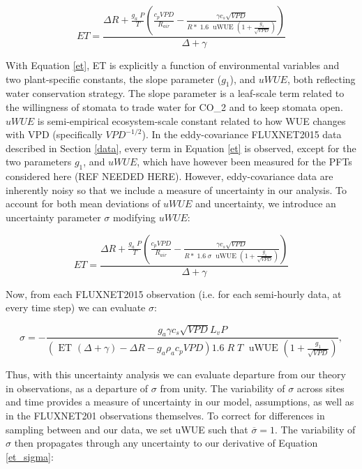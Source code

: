 \documentclass[draft,linenumbers]{agujournal}
\begin{document}
\begin{linenomath*}
  \begin{equation}
    ET = \frac{\Delta R + \frac{g_a\; P}{T} \left( \frac{ c_p VPD}{R_{air}} -  \frac{\gamma c_s \sqrt{VPD} }{ R* \; 1.6\; \text{ uWUE } (1 + \frac{g_1}{\sqrt{VPD}})} \right) }{ \Delta + \gamma}
    \label{et}
  \end{equation}
\end{linenomath*}

With Equation \ref{et}, ET is explicitly a function of environmental variables and two plant-specific constants, the slope parameter ($g_1$), and $uWUE$, both reflecting water conservation strategy. The slope parameter is a leaf-scale term related to the willingness of stomata to trade water for CO_2 and to keep stomata open. $uWUE$ is semi-empirical ecosystem-scale constant related to how WUE changes with VPD (specifically $VPD^{-1/2}$). In the eddy-covariance FLUXNET2015 data described in Section \ref{data}, every term in Equation \ref{et} is observed, except for the two parameters $g_1$, and $uWUE$, which have however been measured for the PFTs considered here (REF NEEDED HERE). However, eddy-covariance data are inherently noisy so that we include a measure of uncertainty in our analysis. To account for both mean deviations of $uWUE$ and uncertainty, we introduce an uncertainty parameter $\sigma$ modifying $uWUE$:

\begin{linenomath*}
  \begin{equation}
    ET = \frac{\Delta R + \frac{g_a\; P}{T} \left( \frac{ c_p VPD}{R_{air}} -  \frac{\gamma c_s \sqrt{VPD} }{ R* \; 1.6\; \sigma \; \text{ uWUE } (1 + \frac{g_1}{\sqrt{VPD}})} \right) }{ \Delta + \gamma}
    \label{et_sigma}
  \end{equation}
\end{linenomath*}

Now, from each FLUXNET2015 observation (i.e. for each semi-hourly data, at every time step) we can evaluate $\sigma$:

\begin{linenomath*}
  \begin{equation}
\sigma = - \frac{g_a \gamma c_s \sqrt{VPD} L_v P }{ \left(\text{ ET } ( \Delta + \gamma) - \Delta R - g_a \rho_a c_p VPD\right) 1.6 \; R\; T\; \text{ uWUE } (1 + \frac{g_1}{\sqrt{VPD}})},
    \label{sigma}
  \end{equation}
\end{linenomath*}

Thus, with this uncertainty analysis we can evaluate departure from our theory in observations, as a departure of $\sigma$ from unity. The variability of $\sigma$ across sites and time provides a measure of uncertainty in our model, assumptions, as well as in the FLUXNET201 observations themselves. To correct for differences in sampling between \cite{Zhou_2015} and our data, we set uWUE such that $\overline{\sigma} = 1$. The variability of $\sigma$ then propagates through any uncertainty to our derivative of Equation \ref{et_sigma}:
\end{document}
